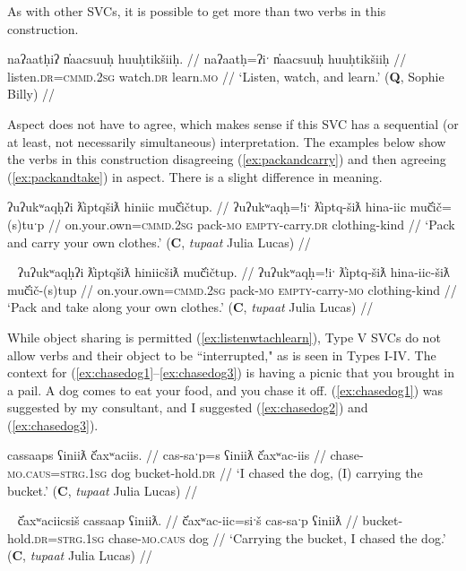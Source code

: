 
As with other SVCs, it is possible to get more than two verbs in this construction.

\ex \label{ex:listenwtachlearn}
\begingl
\glpreamble naʔaatḥiʔ n̓aacsuuḥ huuḥtikšiiḥ. //
\gla naʔaatḥ=ʔiˑ n̓aacsuuḥ huuḥtikšiiḥ //
\glb listen.\textsc{dr}=\textsc{cmmd.2sg} watch.\textsc{dr} learn.\textsc{mo} //
\glft `Listen, watch, and learn.' (\textbf{Q}, Sophie Billy) //
\endgl
\xe

Aspect does not have to agree, which makes sense if this SVC has a sequential (or at least, not necessarily simultaneous) interpretation. The examples below show the verbs in this construction disagreeing (\ref{ex:packandcarry}) and then agreeing (\ref{ex:packandtake}) in aspect. There is a slight difference in meaning.

\ex \label{ex:packandcarry}
\begingl
\glpreamble ʔuʔukʷaqḥʔi ƛ̓iptqšiƛ hiniic muč̓ičtup. //
\gla ʔuʔukʷaqḥ=!iˑ ƛ̓iptq-šiƛ hina-iic muč̓ič=(s)tuˑp //
\glb on.your.own=\textsc{cmmd.2sg} pack-\textsc{mo} \textsc{empty}-carry.\textsc{dr} clothing-kind //
\glft `Pack and carry your own clothes.' (\textbf{C}, \textit{tupaat} Julia Lucas) //
\endgl
\xe

\ex~ \label{ex:packandtake}
\begingl
\glpreamble ʔuʔukʷaqḥʔi ƛ̓iptqšiƛ hiniicšiƛ muč̓ičtup. //
\gla ʔuʔukʷaqḥ=!iˑ ƛ̓iptq-šiƛ hina-iic-šiƛ muč̓ič-(s)tup //
\glb on.your.own=\textsc{cmmd.2sg} pack-\textsc{mo} \textsc{empty}-carry-\textsc{mo} clothing-kind //
\glft `Pack and take along your own clothes.' (\textbf{C}, \textit{tupaat} Julia Lucas) //
\endgl
\xe

While object sharing is permitted (\ref{ex:listenwtachlearn}), Type V SVCs do not allow verbs and their object to be ``interrupted," as is seen in Types I-IV. The context for (\ref{ex:chasedog1}--\ref{ex:chasedog3}) is having a picnic that you brought in a pail. A dog comes to eat your food, and you chase it off. (\ref{ex:chasedog1}) was suggested by my consultant, and I suggested (\ref{ex:chasedog2}) and (\ref{ex:chasedog3}).

\ex \label{ex:chasedog1}
\begingl
\glpreamble cassaaps ʕiniiƛ č̓axʷaciis. //
\gla cas-saˑp=s ʕiniiƛ č̓axʷac-iis //
\glb chase-\textsc{mo.caus}=\textsc{strg.1sg} dog bucket-hold.\textsc{dr} //
\glft `I chased the dog, (I) carrying the bucket.' (\textbf{C}, \textit{tupaat} Julia Lucas) //
\endgl
\xe

\ex~ \label{ex:chasedog2}
\begingl
\glpreamble č̓axʷaciicsiš cassaap ʕiniiƛ. //
\gla č̓axʷac-iic=siˑš cas-saˑp ʕiniiƛ //
\glb bucket-hold.\textsc{dr}=\textsc{strg.1sg} chase-\textsc{mo.caus} dog //
\glft `Carrying the bucket, I chased the dog.' (\textbf{C}, \textit{tupaat} Julia Lucas) //
\endgl
\xe

